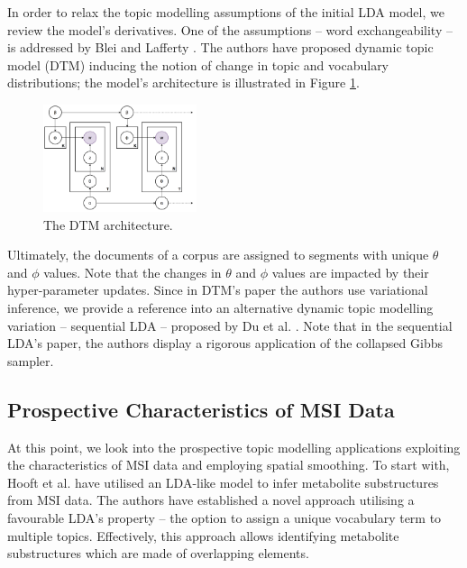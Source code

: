 \documentclass{mpaper}
\begin{document}
\par In order to relax the topic modelling assumptions of the initial LDA model, we review the model's derivatives. One of the assumptions -- word exchangeability -- is addressed by Blei and Lafferty \cite{blei2006dynamic}. 
The authors have proposed dynamic topic model (DTM) inducing the notion of change in topic and vocabulary distributions; the model's architecture is illustrated in Figure \ref{fig:arch_dtm}.
\begin{figure}[h]
  \centering
  \includegraphics[width=0.4\textwidth]{dtm-architecture.png}
  \caption{The DTM architecture.}
  \label{fig:arch_dtm}
\end{figure}
Ultimately, the documents of a corpus are assigned to segments with unique $\theta$ and $\phi$ values. Note that the changes in $\theta$ and $\phi$ values are impacted by their hyper-parameter updates. Since in DTM's paper the authors use variational inference, we provide a reference into an alternative dynamic topic modelling variation -- sequential LDA -- proposed by Du et al. \cite{du2012sequential}. Note that in the sequential LDA's paper, the authors display a rigorous application of the collapsed Gibbs sampler. 

\subsection{Prospective Characteristics of MSI Data}
\par At this point, we look into the prospective topic modelling applications exploiting the characteristics of MSI data and employing spatial smoothing. To start with, Hooft et al. \cite{van2016topic} have utilised an LDA-like model to infer metabolite substructures from MSI data. The authors have established a novel approach utilising a favourable LDA's property -- the option to assign a unique vocabulary term to multiple topics. Effectively, this approach allows identifying metabolite substructures which are made of overlapping elements. 
\end{document}
